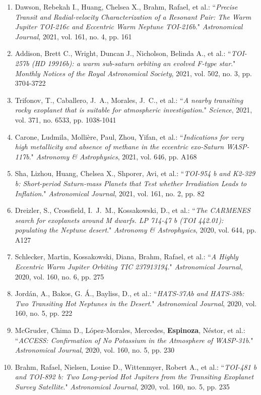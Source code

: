 \documentclass[12pt, a4paper]{article} %
\begin{document}
\begin{flushleft}
\begin{enumerate}
\item Dawson, Rebekah I., Huang, Chelsea X., Brahm, Rafael, et al.: ``\textit{Precise Transit and Radial-velocity Characterization of a Resonant Pair: The Warm Jupiter TOI-216c and Eccentric Warm Neptune TOI-216b}." \textit{Astronomical Journal}, 2021, vol. 161, no. 4, pp. 161
\item Addison, Brett C., Wright, Duncan J., Nicholson, Belinda A., et al.: ``\textit{TOI-257b (HD 19916b): a warm sub-saturn orbiting an evolved F-type star}." \textit{Monthly Notices of the Royal Astronomical Society}, 2021, vol. 502, no. 3, pp. 3704-3722
\item Trifonov, T., Caballero, J.~A., Morales, J.~C., et al.: ``\textit{A nearby transiting rocky exoplanet that is suitable for atmospheric investigation}." \textit{Science}, 2021, vol. 371, no. 6533, pp. 1038-1041
\item Carone, Ludmila, Mollière, Paul, Zhou, Yifan, et al.: ``\textit{Indications for very high metallicity and absence of methane in the eccentric exo-Saturn WASP-117b}." \textit{Astronomy \& Astrophysics}, 2021, vol. 646, pp. A168
\item Sha, Lizhou, Huang, Chelsea X., Shporer, Avi, et al.: ``\textit{TOI-954 b and K2-329 b: Short-period Saturn-mass Planets that Test whether Irradiation Leads to Inflation}." \textit{Astronomical Journal}, 2021, vol. 161, no. 2, pp. 82
\item Dreizler, S., Crossfield, I.~J.~M., Kossakowski, D., et al.: ``\textit{The CARMENES search for exoplanets around M dwarfs. LP 714-47 b (TOI 442.01): populating the Neptune desert}." \textit{Astronomy \& Astrophysics}, 2020, vol. 644, pp. A127
\item Schlecker, Martin, Kossakowski, Diana, Brahm, Rafael, et al.: ``\textit{A Highly Eccentric Warm Jupiter Orbiting TIC 237913194}." \textit{Astronomical Journal}, 2020, vol. 160, no. 6, pp. 275
\item Jordán, A., Bakos, G. Á., Bayliss, D., et al.: ``\textit{HATS-37Ab and HATS-38b: Two Transiting Hot Neptunes in the Desert}." \textit{Astronomical Journal}, 2020, vol. 160, no. 5, pp. 222
\item McGruder, Chima D., López-Morales, Mercedes, \textbf{Espinoza}, Néstor, et al.: ``\textit{ACCESS: Confirmation of No Potassium in the Atmosphere of WASP-31b}." \textit{Astronomical Journal}, 2020, vol. 160, no. 5, pp. 230
\item Brahm, Rafael, Nielsen, Louise D., Wittenmyer, Robert A., et al.: ``\textit{TOI-481 b and TOI-892 b: Two Long-period Hot Jupiters from the Transiting Exoplanet Survey Satellite}." \textit{Astronomical Journal}, 2020, vol. 160, no. 5, pp. 235

\end{enumerate}
\end{flushleft}
\end{document}
